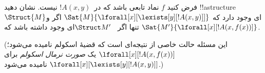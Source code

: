\documentclass[../../../include/open-logic-section]{subfiles}
\begin{document}
\begin{prob}
فرض کنید $f$ نماد تابعی باشد که در~$!A(x,y)$ نیست. نشان دهید
!!a{structure}~$\Struct{M}$ای وجود دارد که
$\Sat{M}{\lforall[x][\lexists[y][!A(x,y)]]}$ اگر و تنها اگر
~$\Struct M'$ای وجود داشته باشد که
$\Sat{M'}{\lforall[x][!A(x,f(x))]}$.

(این مسئله حالت خاصی از نتیجه‌ای است که قضیهٔ اسکولم نامیده می‌شود؛
$\lforall[x][!A(x,f(x))]$ یک \emph{صورت نرمال اسکولم} برای
$\lforall[x][\lexists[y][!A(x,y)]]$ نامیده می‌شود.)
\end{prob}
\end{document}
